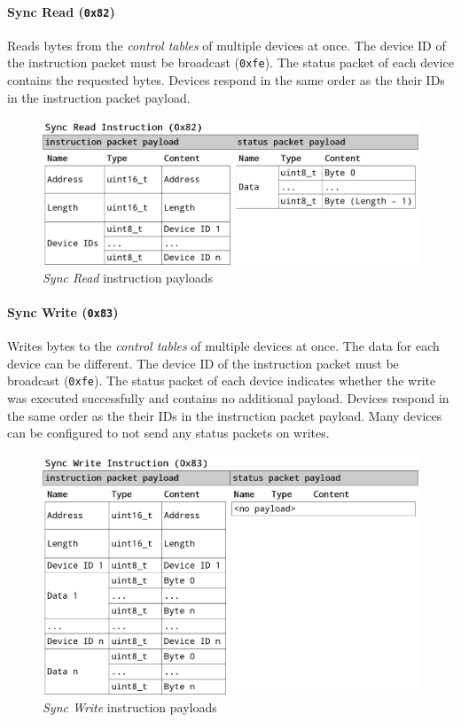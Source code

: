 \paragraph{Sync Read (\lstinline{0x82})}

Reads bytes from the \textit{control tables} of multiple devices at once. The device ID of the
instruction packet must be broadcast (\lstinline{0xfe}). The status packet of each device contains
the requested bytes. Devices respond in the same order as the their IDs in the instruction packet
payload.

\begin{figure}[H]
    \centering
    \includegraphics[scale=0.2]{img/sync_read_packet.png}
    \caption{\textit{Sync Read} instruction payloads}
\end{figure}

\paragraph{Sync Write (\lstinline{0x83})}

Writes bytes to the \textit{control tables} of multiple devices at once. The data for each device
can be different. The device ID of the instruction packet must be broadcast (\lstinline{0xfe}). The
status packet of each device indicates whether the write was executed successfully and contains no
additional payload. Devices respond in the same order as the their IDs in the instruction packet
payload. Many devices can be configured to not send any status packets on writes.

\begin{figure}[H]
    \centering
    \includegraphics[scale=0.2]{img/sync_write_packet.png}
    \caption{\textit{Sync Write} instruction payloads}
\end{figure}

